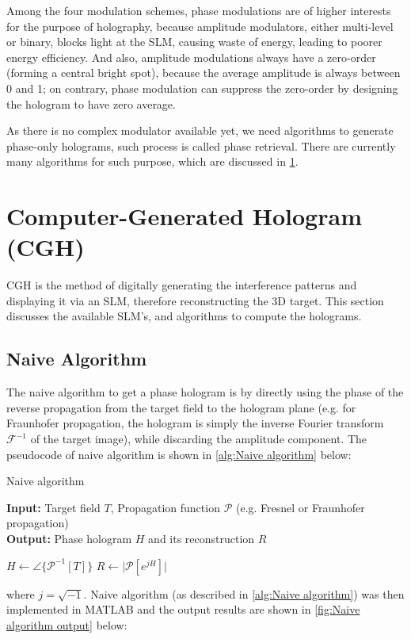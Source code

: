 Among the four modulation schemes, phase modulations are of higher interests for the purpose of holography, because amplitude modulators, either multi-level or binary, blocks light at the SLM, causing waste of energy, leading to poorer energy efficiency. And also, amplitude modulations always have a zero-order (forming a central bright spot), because the average amplitude is always between 0 and 1; on contrary, phase modulation can suppress the zero-order by designing the hologram to have zero average.

As there is no complex modulator available yet, we need algorithms to generate phase-only holograms, such process is called phase retrieval. There are currently many algorithms for such purpose, which are discussed in \cref{sec:cgh}.


\section{Computer-Generated Hologram (CGH)}\label{sec:cgh}
CGH is the method of digitally generating the interference patterns and displaying it via an SLM, therefore reconstructing the 3D target. This section discusses the available SLM's, and algorithms to compute the holograms.


\subsection{Naive Algorithm}\label{sec:Naive algorithm}
The naive algorithm to get a phase hologram is by directly using the phase of the reverse propagation from the target field to the hologram plane (e.g. for Fraunhofer propagation, the hologram is simply the inverse Fourier transform $\mathcal{F} ^{-1}$ of the target image), while discarding the amplitude component. The pseudocode of naive algorithm is shown in \cref{alg:Naive algorithm} below:
\begin{algorithm}[H]
  \caption{Naive algorithm}\label{alg:Naive algorithm}
  \textbf{Input:} Target field $T$, Propagation function $\mathcal{P}$ (e.g. Fresnel or Fraunhofer propagation)\\
  \textbf{Output:} Phase hologram $H$ and its reconstruction $R$
  \begin{algorithmic}
    \State $H \gets \angle\{\mathcal{P}^{-1}[T]\}$
    \State $R \gets \vert \mathcal{P}[e^{jH}] \vert$
  \end{algorithmic}
\end{algorithm}
where $j = \sqrt{-1} $. Naive algorithm (as described in \cref{alg:Naive algorithm}) was then implemented in MATLAB and the output results are shown in \cref{fig:Naive algorithm output} below:


